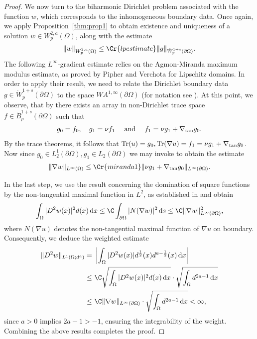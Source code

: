 \documentclass[12pt,a4paper,twoside]{article}
\newcommand{\diff}{\operatorname{d}\!}
\newcommand {\cb}[1] {\tikz[baseline=(char.base)]{
            \node[shape=circle,draw,inner sep=2pt] (char) {\itshape{\textbf{#1}}};}}
\begin{document}
\begin{proof}
\noindent\cb{2}
We now turn to the biharmonic Dirichlet problem associated with the function $w$, which corresponds to the inhomogeneous boundary data. Once again, we apply Proposition~\ref{thm:prop1} to obtain existence and uniqueness of a solution $w\in W^{2,a}_p(\Omega)$, along with the estimate
\begin{align*}
    \| w\|_{W^{2,a}_p(\Omega)}\le \Cr{lpestimate} \|g\|_{\dot W^{1+s}_p(\partial\Omega)}.
\end{align*}
The following $L^\infty$-gradient estimate relies on the Agmon-Miranda maximum modulus estimate, as proved by Pipher and Verchota for Lipschitz domains.  In order to apply their result, we need to relate the Dirichlet boundary data $g\in \dot W^{1+s}_p(\partial\Omega)$ to the space $WA^{1,\infty}(\partial\Omega)$ (for notation see \cite{Pipher1993}). At this point, we observe, that by \cite[p.230 Corollary 7.10]{maz2010dirichlet} there exists an array in non-Dirichlet trace space $f\in \dot B^{1+s}_p(\partial\Omega)$ such that 
\begin{align*}
    g_0= f_0, \quad g_1= \nu f_1 \quad \text{ and } \quad f_1=\nu g_1+ \nabla_{\rm tan} g_0.
\end{align*}
By the trace theorems, it follows that ${\rm Tr}(u)=g_0, {\rm Tr}(\nabla u) =f_1= \nu g_1+ \nabla_{\rm tan} g_0$. Now since $g_0\in L_2^1(\partial\Omega),  g_1\in L_2(\partial\Omega)$ we may invoke \cite[p. 387 Theorem 1.2]{Pipher1993} to obtain the estimate
\begin{align*}
    \|\nabla w\|_{L^\infty(\Omega)} \le \Cr{miranda1} \|\nu g_1+\nabla_{\rm tan} g_0\|_{L^\infty(\partial\Omega)}. 
\end{align*}

\noindent\cb{3}
In the last step, we use the result concerning the domination of square functions by the non-tangential maximal function in $L^2$, as established in \cite[p.1455 Theorem 2]{dahlberg1997area} and obtain
\begin{align*}
    \int_\Omega |D^2w(x)|^2 d(x) \diff x \le  \C \int_{\partial\Omega}| N(\nabla w)|^2 \diff s  \le \C \|\nabla w\| _{L^\infty(\partial\Omega)}^2,
\end{align*}
where $N(\nabla u) $ denotes the non-tangential maximal function of $\nabla u$ on boundary. Consequently, we deduce the weighted estimate
\begin{align*}
  \|D^2w\|_{L^1(\Omega;d^a)} = &\  \left|\int_\Omega |D^2 w(x)| 
    d^{\frac{1}{2}}(x)  d^{a-\frac{1}{2}}(x)
    \diff x   \right| \\
    \le &\   \C  \sqrt{\int_\Omega |D^2 w(x)| ^2
    d(x)  
    \diff x   }  \cdot \sqrt{\int _\Omega d^{2a-1}\diff x}\\
    \le &\  \C \|\nabla w\| _{L^\infty(\partial\Omega)} \cdot \sqrt{\int _\Omega d^{2a-1}\diff x}<\infty,
\end{align*}
since  $a>0$ implies $2a-1>-1$, ensuring the integrability of the weight. Combining the above results completes the proof.
\end{proof}
\end{document}
